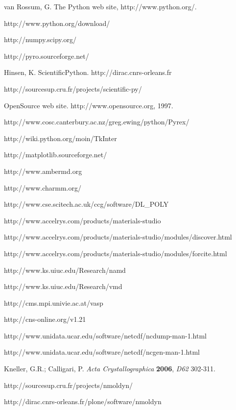 \documentclass[a4paper,11pt]{report}
\begin{document}
\begin{thebibliography}{99}
 van Rossum, G. The Python web site, http://www.python.org/.

 http://www.python.org/download/

 http://numpy.scipy.org/

 http://pyro.sourceforge.net/

 Hinsen, K. ScientificPython. http://dirac.cnrs-orleans.fr  

 http://sourcesup.cru.fr/projects/scientific-py/

 OpenSource web site. http://www.opensource.org, 1997.

 http://www.cosc.canterbury.ac.nz/greg.ewing/python/Pyrex/

 http://wiki.python.org/moin/TkInter

 http://matplotlib.sourceforge.net/

 http://www.ambermd.org

 http://www.charmm.org/

 http://www.cse.scitech.ac.uk/ccg/software/DL\_POLY

 http://www.accelrys.com/products/materials-studio

 http://www.accelrys.com/products/materials-studio/modules/discover.html

 http://www.accelrys.com/products/materials-studio/modules/forcite.html

 http://www.ks.uiuc.edu/Research/namd

 http://www.ks.uiuc.edu/Research/vmd

 http://cms.mpi.univie.ac.at/vasp

 http://cns-online.org/v1.21

 http://www.unidata.ucar.edu/software/netcdf/ncdump-man-1.html

 http://www.unidata.ucar.edu/software/netcdf/ncgen-man-1.html

 Kneller, G.R.; Calligari, P. \textit{Acta Crystallographica} \textbf{2006}, \textit{D62} 302-311.

 http://sourcesup.cru.fr/projects/nmoldyn/

 http://dirac.cnrs-orleans.fr/plone/software/nmoldyn


\end{thebibliography}
\end{document}

